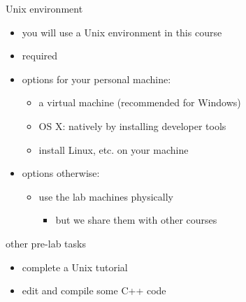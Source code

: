 \begin{frame}{Unix environment}
\begin{itemize}
    \item you will use a Unix environment in this course
    \item required 
    \item options for your personal machine:
        \begin{itemize}
        \item a virtual machine (recommended for Windows)
        \item OS X: natively by installing developer tools
        \item install Linux, etc. on your machine
        \end{itemize}
    \item options otherwise:
        \begin{itemize}
        \item use the lab machines physically 
            \begin{itemize}
            \item but we share them with other courses
            \end{itemize}
        \end{itemize}
\end{itemize}
\end{frame}

\begin{frame}{other pre-lab tasks}
\begin{itemize}
    \item complete a Unix tutorial
    \item edit and compile some C++ code
\end{itemize}
\end{frame}
